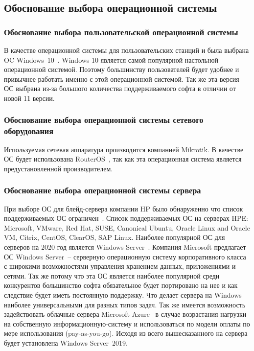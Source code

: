 \subsection{Обоснование выбора операционной системы}

\subsubsection{Обоснование выбора пользовательской операционной системы}
В качестве операционной системы для пользовательских станций и была выбрана OC Windows~10~\cite{win_10}. Windows 10 является самой популярной настольной операционной системой. Поэтому большинству пользователей будет удобнее и привычнее работать именно с этой операционной системой. Так же эта версия ОС выбрана из-за большого количества поддерживаемого софта в отличии от новой 11 версии.

\subsubsection{Обоснование выбора операционной системы сетевого оборудования}

Используемая сетевая аппаратура производится компанией Mikrotik. В качестве ОС будет использована RouterOS~\cite{router_os}, так как эта операционная система является предустановленной производителем.

\subsubsection{Обоснование выбора операционной системы сервера}

При выборе ОС для блейд-сервера компании HP было обнаруженно что список поддерживаемых ОС ограничен~\cite{server_support_os}. Список поддерживаемых ОС на серверах HPE: Microsoft, VMware, Red Hat, SUSE, Canonical Ubuntu, Oracle Linux and Oracle VM, Citrix, CentOS, ClearOS, SAP Linux. Наиболее популярной ОС для серверов на 2020 год является Windows Server~\cite{server_top_os}. Компания Microsoft предлагает ОС Windows Server~-- серверную операционную систему корпоративного класса с широкими возможностями управления хранением данных, приложениями и сетями. Так же потому что эта ОС является наиболее популярной среди конкурентов большинство софта обязательное будет портировано на нее и как следствие будет иметь постоянную поддержку. Что делает сервера на Windows наиболее универсальными для разных типов задач. Так же имеется возможность задействовать облачные сервера Microsoft Azure~\cite{microsoft_azure} в случае возрастания нагрузки на собственную информационную-систему и использоваться по модели оплаты по мере использования (pay-as-you-go). Исходя из всего вышесказанного на сервера будет установлена Windows Server~2019.

